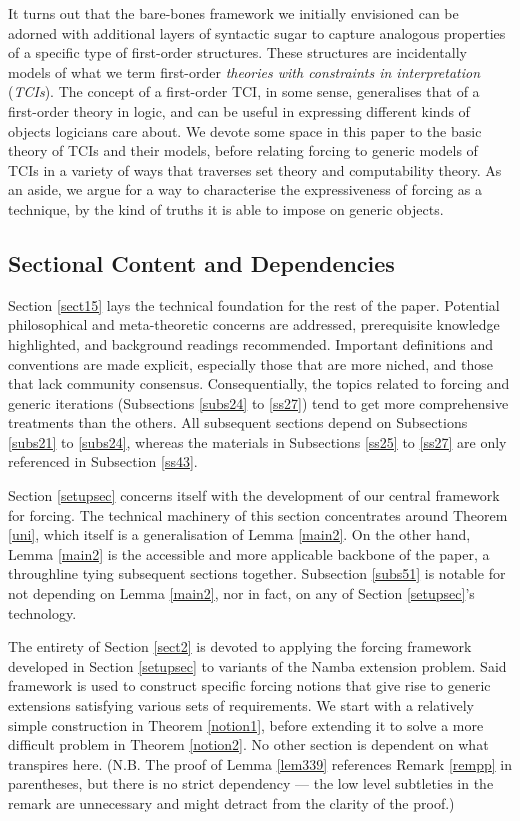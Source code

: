 \documentclass[12pt]{article}
\numberwithin{equation}{section}
\begin{document}
It turns out that the bare-bones framework we initially envisioned can be adorned with additional layers of syntactic sugar to capture analogous properties of a specific type of first-order structures. These structures are incidentally models of what we term first-order \emph{theories with constraints in interpretation} (\emph{TCIs}). The concept of a first-order TCI, in some sense, generalises that of a first-order theory in logic, and can be useful in expressing different kinds of objects logicians care about. We devote some space in this paper to the basic theory of TCIs and their models, before relating forcing to generic models of TCIs in a variety of ways that traverses set theory and computability theory. As an aside, we argue for a way to characterise the expressiveness of forcing as a technique, by the kind of truths it is able to impose on generic objects.

\subsection{Sectional Content and Dependencies}

Section \ref{sect15} lays the technical foundation for the rest of the paper. Potential philosophical and meta-theoretic concerns are addressed, prerequisite knowledge highlighted, and background readings recommended. Important definitions and conventions are made explicit, especially those that are more niched, and those that lack community consensus. Consequentially, the topics related to forcing and generic iterations (Subsections \ref{subs24} to \ref{ss27}) tend to get more comprehensive treatments than the others. All subsequent sections depend on Subsections \ref{subs21} to \ref{subs24}, whereas the materials in Subsections \ref{ss25} to \ref{ss27} are only referenced in Subsection \ref{ss43}.

Section \ref{setupsec} concerns itself with the development of our central framework for forcing. The technical machinery of this section concentrates around Theorem \ref{uni}, which itself is a generalisation of Lemma \ref{main2}. On the other hand, Lemma \ref{main2} is the accessible and more applicable backbone of the paper, a throughline tying subsequent sections together. Subsection \ref{subs51} is notable for not depending on Lemma \ref{main2}, nor in fact, on any of Section \ref{setupsec}'s technology.

The entirety of Section \ref{sect2} is devoted to applying the forcing framework developed in Section \ref{setupsec} to variants of the Namba extension problem. Said framework is used to construct specific forcing notions that give rise to generic extensions satisfying various sets of requirements. We start with a relatively simple construction in Theorem \ref{notion1}, before extending it to solve a more difficult problem in Theorem \ref{notion2}. No other section is dependent on what transpires here. (N.B. The proof of Lemma \ref{lem339} references Remark \ref{rempp} in parentheses, but there is no strict dependency --- the low level subtleties in the remark are unnecessary and might detract from the clarity of the proof.)
\end{document}
